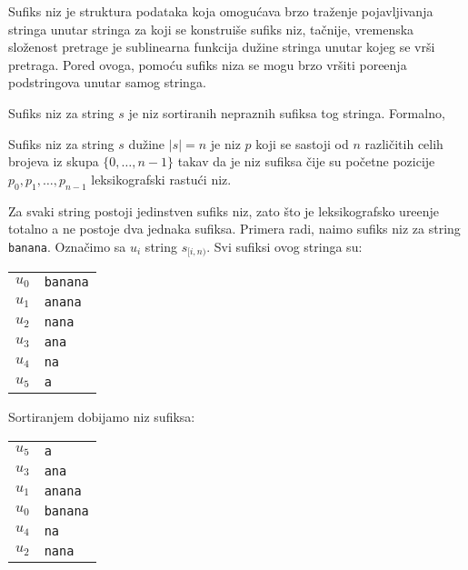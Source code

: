 
Sufiks niz je struktura podataka koja omogu\' cava brzo tra\v zenje pojavljivanja stringa unutar stringa za koji se konstrui\v se sufiks niz, ta\v cnije, vremenska slo\v zenost pretrage je sublinearna funkcija du\v zine stringa unutar kojeg se vr\v si pretraga. Pored ovoga, pomo\' cu sufiks niza se mogu brzo vr\v siti pore\dj enja podstringova unutar samog stringa.

Sufiks niz za string $s$ je niz sortiranih nepraznih sufiksa tog stringa. Formalno,

\begin{dfn}
Sufiks niz za string $s$ du\v zine $|s| = n$ je niz $p$ koji se sastoji od $n$ razli\v citih celih brojeva iz skupa $\{0,\ldots,n-1\}$ takav da je niz sufiksa \v cije su po\v cetne pozicije $p_0, p_1, \ldots, p_{n-1}$ leksikografski rastu\' ci niz.
\end{dfn}

Za svaki string postoji jedinstven sufiks niz, zato \v sto je leksikografsko ure\dj enje totalno a ne postoje dva jednaka sufiksa. Primera radi, na\dj imo sufiks niz za string \texttt{banana}. Ozna\v cimo sa $u_i$ string $s_{[i,n)}$. Svi sufiksi ovog stringa su:

\begin{center}
\begin{tabular}{cl}
    $u_0$ & \texttt{banana} \\
    $u_1$ & \texttt{anana} \\
    $u_2$ & \texttt{nana} \\
    $u_3$ & \texttt{ana} \\
    $u_4$ & \texttt{na} \\
    $u_5$ & \texttt{a} \\
\end{tabular}
\end{center}

Sortiranjem dobijamo niz sufiksa:

\begin{center}
\begin{tabular}{cl}
    $u_5$ & \texttt{a} \\
    $u_3$ & \texttt{ana} \\
    $u_1$ & \texttt{anana} \\
    $u_0$ & \texttt{banana} \\
    $u_4$ & \texttt{na} \\
    $u_2$ & \texttt{nana} \\
\end{tabular}
\end{center}

